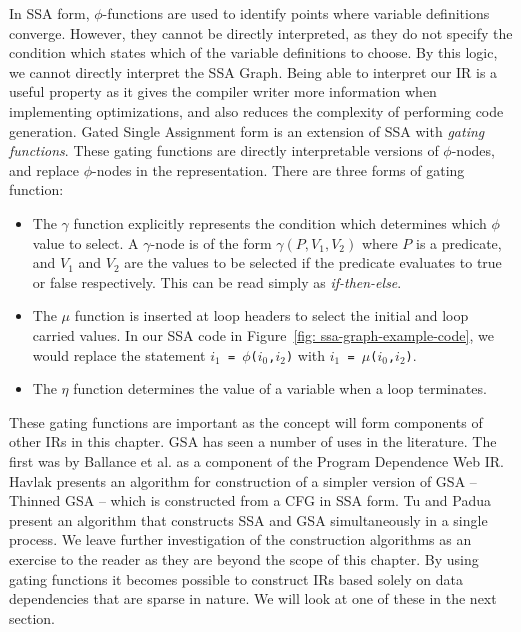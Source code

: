 In SSA form, $\phi$-functions are used to identify points where variable definitions converge. However, they cannot be directly interpreted, as they do not specify the condition which states which of the variable definitions to choose. By this logic, we cannot directly interpret the SSA Graph. Being able to interpret our IR is a useful property as it gives the compiler writer more information when implementing optimizations, and also reduces the complexity of performing code generation. Gated Single Assignment form  is an extension of SSA with \textit{gating functions}. These gating functions are directly interpretable versions of $\phi$-nodes, and replace $\phi$-nodes in the representation. There are three forms of gating function:

\begin{itemize}
\item The $\gamma$ function explicitly represents the condition which determines which $\phi$ value to select. A $\gamma$-node is of the form $\gamma(P,V_{1},V_{2})$ where $P$ is a predicate, and $V_{1}$ and $V_{2}$ are the values to be selected if the predicate evaluates to true or false respectively. This can be read simply as \textit{if-then-else}. 
\item The $\mu$ function is inserted at loop headers to select the initial and loop carried values. In our SSA code in Figure~\ref{fig: ssa-graph-example-code}, we would replace the statement \texttt{$i_{1}$ = $\phi$($i_{0}$,$i_{2}$)} with \texttt{$i_{1}$ = $\mu$($i_{0}$,$i_{2}$)}.
\item The $\eta$ function determines the value of a variable when a loop terminates.
\end{itemize}

These gating functions are important as the concept will form components of other IRs in this chapter. GSA has seen a number of uses in the literature. The first was by Ballance et al. \cite{93578} as a component of the Program Dependence Web IR. Havlak \cite{Havlak93constructionof} presents an algorithm for construction of a simpler version of GSA -- Thinned GSA -- which is constructed from a CFG in SSA form. Tu and Padua \cite{207115} present an algorithm that constructs SSA and GSA simultaneously in a single process. We leave further investigation of the construction algorithms as an exercise to the reader as they are beyond the scope of this chapter. By using gating functions it becomes possible to construct IRs based solely on data dependencies that are sparse in nature. We will look at one of these in the next section.

